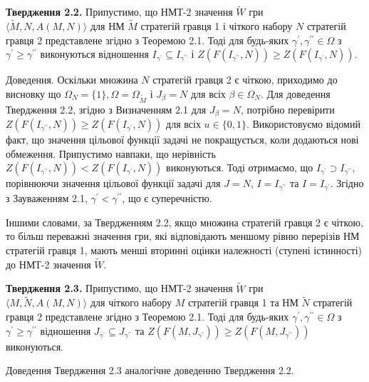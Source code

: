 \documentclass[14pt, a4paper, oneside]{extarticle}
\numberwithin{equation}{section}
\begin{document}
\textbf{Твердження 2.2.} Припустимо, що НМТ-2 значення $\tilde{W}$ гри\\ $\langle\tilde{M}, N, A(M, N)\rangle$ для НМ $\tilde{M}$ стратегій гравця 1 і чіткого набору $N$ стратегій гравця 2 представлене згідно з Теоремою 2.1. Тоді для будь-яких $\gamma^{\prime}, \gamma^{\prime \prime} \in \Omega$ з $\gamma^{\prime} \geq \gamma^{\prime \prime}$ виконуються відношення $I_{\gamma^{\prime}} \subseteq I_{\gamma^{\prime \prime}}$ і $Z\left(F\left(I_{\gamma^{\prime \prime}}, N\right)\right) \geq Z\left(F\left(I_{\gamma^{\prime}}, N\right)\right)$.

Доведення. Оскільки множина $N$ стратегій гравця 2 є чіткою, приходимо до висновку що $\Omega_{N}=\{1\}, \Omega=\Omega_{\tilde{M}}$ і $J_{\beta}=N$ для всіх $\beta \in \Omega_{N}$. Для доведення Твердження 2.2, згідно з Визначенням 2.1 для $J_{\beta}=N$, потрібно перевірити $Z\left(F\left(I_{\gamma^{\prime \prime}}, N\right)\right) \geq Z\left(F\left(I_{\gamma^{\prime}}, N\right)\right)$ для всіх $u \in\{0,1\}$. Використовуємо відомий факт, що значення цільової функції задачі не покращується, коли додаються нові обмеження. Припустимо навпаки, що нерівність $Z\left(F\left(I_{\gamma^{\prime \prime}}, N\right)\right)<Z\left(F\left(I_{\gamma^{\prime}}, N\right)\right)$ виконуються. Тоді отримаємо, що $I_{\gamma^{\prime}} \supset I_{\gamma^{\prime \prime}}$, порівнюючи значення цільової функції задачі для $J=N$, $I=I_{\gamma^{\prime \prime}}$ та $I=I_{\gamma^{\prime}}$. Згідно з Зауваженням 2.1, $\gamma^{\prime}<\gamma^{\prime \prime}$, що є суперечністю.

Іншими словами, за Твердженням 2.2, якщо множина стратегій гравця 2 є чіткою, то більш переважні значення гри, які відповідають меншому рівню перерізів НМ стратегій гравця 1, мають менші вторинні оцінки належності (ступені істинності) до НМТ-2 значення $\tilde{W}$.

\textbf{Твердження 2.3.} Припустимо, що НМТ-2 значення $\tilde{W}$ гри\\ $\langle M, \tilde{N}, A(M, N)\rangle$ для чіткого набору $M$ стратегій гравця 1 та НМ $\tilde{N}$ стратегій гравця 2 представлене згідно з Теоремою 2.1. Тоді для будь-яких $\gamma^{\prime}, \gamma^{\prime \prime} \in \Omega$ з $\gamma^{\prime} \geq \gamma^{\prime \prime}$ відношення $J_{\gamma^{\prime}} \subseteq J_{\gamma^{\prime \prime}}$ та $Z\left(F\left(M, J_{\gamma^{\prime}}\right)\right) \geq Z\left(F\left(M, J_{\gamma^{\prime \prime}}\right)\right)$ виконуються.

Доведення Твердження 2.3 аналогічне доведенню Твердження 2.2.
\end{document}
